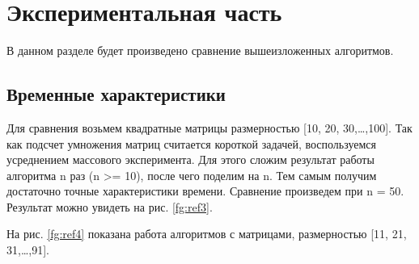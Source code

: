 \chapter{Экспериментальная часть}

В данном разделе будет произведено сравнение вышеизложенных алгоритмов.

\section{Временные характеристики}


Для сравнения возьмем квадратные матрицы размерностью [10, 20, 30,\dots,100]. 
Так как подсчет умножения матриц считается короткой задачей, воспользуемся усреднением массового эксперимента. 
Для этого сложим результат работы алгоритма n раз (n >= 10), после чего поделим на n. 
Тем самым получим достаточно точные характеристики времени. 
Сравнение произведем при n = 50.
Результат можно увидеть на рис. \ref{fg:ref3}. 

\begin{figure}[ht!]
\end{figure}

На рис. \ref{fg:ref4} показана работа алгоритмов с матрицами, размерностью [11, 21, 31,\dots,91].

